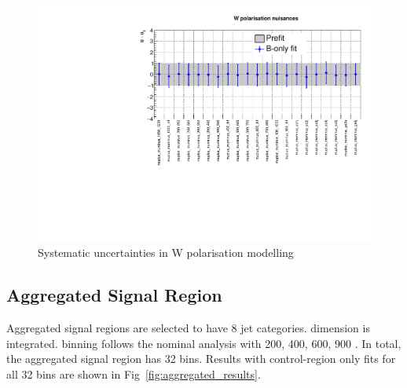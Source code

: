 \begin{figure}[h!]
  \centering
  \caption{Systematic uncertainties in W polarisation modelling}
  \includegraphics[width=0.8\linewidth]{figures/results/36invfb/postfit/nuis/WPol_nuisances}
\end{figure}

\clearpage
\subsection{Aggregated Signal Region}
\label{app:aggregated}
Aggregated signal regions are selected to have 8 jet categories. 
\scalht dimension is integrated. \HTmiss binning follows the nominal 
analysis with 200, 400, 600, 900 \gev. In total, the aggregated signal 
region has 32 bins. Results with control-region only fits for all 32 bins 
are shown in Fig~\ref{fig:aggregated_results}.

